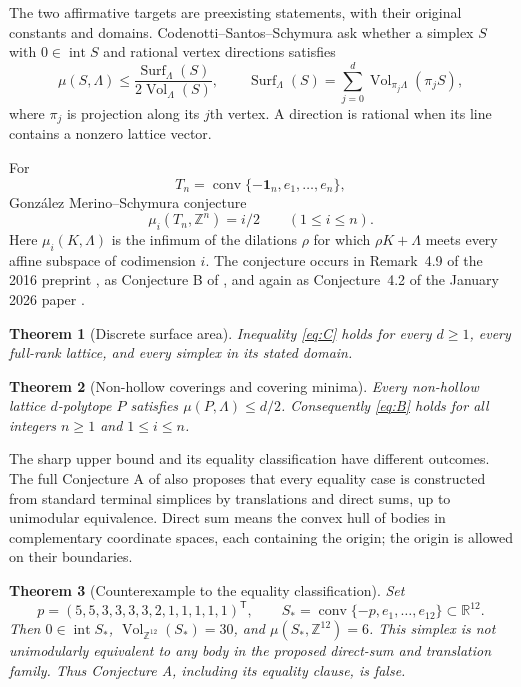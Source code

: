 \documentclass[11pt,a4paper]{article}
\newtheorem{theorem}{Theorem}[section]
\theoremstyle{definition}\newtheorem{definition}[theorem]{Definition}
\theoremstyle{remark}\newtheorem{remark}[theorem]{Remark}
\DeclareMathOperator{\conv}{conv}
\DeclareMathOperator{\Vol}{Vol}
\DeclareMathOperator{\Surf}{Surf}
\DeclareMathOperator{\inter}{int}
\newcommand{\R}{\mathbb R}\newcommand{\Z}{\mathbb Z}
\newcommand{\one}{\mathbf1}
\begin{document}
The two affirmative targets are preexisting statements, with their
original constants and domains. Codenotti--Santos--Schymura
\cite[Conjecture C]{CSS} ask whether a simplex $S$ with $0\in\inter S$
and rational vertex directions satisfies
\begin{equation}\label{eq:C}
 \mu(S,\Lambda)\le
 \frac{\Surf_\Lambda(S)}{2\Vol_\Lambda(S)},
 \qquad
 \Surf_\Lambda(S)=\sum_{j=0}^{d}
       \Vol_{\pi_j\Lambda}(\pi_j S),
\end{equation}
where $\pi_j$ is projection along its $j$th vertex. A direction is
rational when its line contains a nonzero lattice vector.

For
\begin{equation}\label{eq:Tn}
 T_n=\conv\{-\one_n,e_1,\ldots,e_n\},
\end{equation}
Gonz\'alez Merino--Schymura conjecture
\begin{equation}\label{eq:B}
 \mu_i(T_n,\Z^n)=i/2\qquad(1\le i\le n).
\end{equation}
Here $\mu_i(K,\Lambda)$ is the infimum of the dilations $\rho$ for
which $\rho K+\Lambda$ meets every affine subspace of codimension $i$.
The conjecture occurs in Remark~4.9 of the 2016 preprint
\cite{GMS}, as Conjecture B of \cite{CSS}, and again as
Conjecture~4.2 of the January 2026 paper \cite{Krivokuca}.

\begin{theorem}[Discrete surface area]\label{thm:mainC}
Inequality \eqref{eq:C} holds for every $d\ge1$, every full-rank
lattice, and every simplex in its stated domain.
\end{theorem}

\begin{theorem}[Non-hollow coverings and covering minima]\label{thm:mainB}
Every non-hollow lattice $d$-polytope $P$ satisfies
$\mu(P,\Lambda)\le d/2$. Consequently \eqref{eq:B} holds for all
integers $n\ge1$ and $1\le i\le n$.
\end{theorem}

The sharp upper bound and its equality classification have different
outcomes. The full Conjecture A of \cite{CSS} also proposes that every
equality case is constructed from standard terminal simplices by
translations and direct sums, up to unimodular equivalence. Direct sum
means the convex hull of bodies in complementary coordinate spaces,
each containing the origin; the origin is allowed on their boundaries.

\begin{theorem}[Counterexample to the equality classification]
\label{thm:mainA}
Set
\[
 p=(5,5,3,3,3,3,2,1,1,1,1,1)^{\mathsf T},\qquad
 S_* =\conv\{-p,e_1,\ldots,e_{12}\}\subset\R^{12}.
\]
Then $0\in\inter S_*$, $\Vol_{\Z^{12}}(S_*)=30$, and
$\mu(S_*,\Z^{12})=6$. This simplex is not unimodularly equivalent
to any body in the proposed direct-sum and translation family.
Thus Conjecture A, including its equality clause, is false.
\end{theorem}
\end{document}
